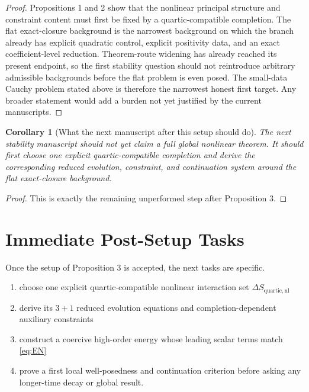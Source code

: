 \documentclass[11pt]{article}
\newtheorem{corollary}{Corollary}
\begin{document}
\begin{proof}
Propositions 1 and 2 show that the nonlinear principal structure and constraint content must first be fixed by a quartic-compatible completion. The flat exact-closure background is the narrowest background on which the branch already has explicit quadratic control, explicit positivity data, and an exact coefficient-level reduction. Theorem-route widening has already reached its present endpoint, so the first stability question should not reintroduce arbitrary admissible backgrounds before the flat problem is even posed. The small-data Cauchy problem stated above is therefore the narrowest honest first target. Any broader statement would add a burden not yet justified by the current manuscripts.
\end{proof}

\begin{corollary}[What the next manuscript after this setup should do]
The next stability manuscript should not yet claim a full global nonlinear theorem. It should first choose one explicit quartic-compatible completion and derive the corresponding reduced evolution, constraint, and continuation system around the flat exact-closure background.
\end{corollary}

\begin{proof}
This is exactly the remaining unperformed step after Proposition 3.
\end{proof}

\section{Immediate Post-Setup Tasks}

Once the setup of Proposition 3 is accepted, the next tasks are specific.
\begin{enumerate}
    \item choose one explicit quartic-compatible nonlinear interaction set \(\Delta S_{\mathrm{quartic,nl}}\)
    \item derive its \(3+1\) reduced evolution equations and completion-dependent auxiliary constraints
    \item construct a coercive high-order energy whose leading scalar terms match \eqref{eq:EN}
    \item prove a first local well-posedness and continuation criterion before asking any longer-time decay or global result.
\end{enumerate}
\end{document}
